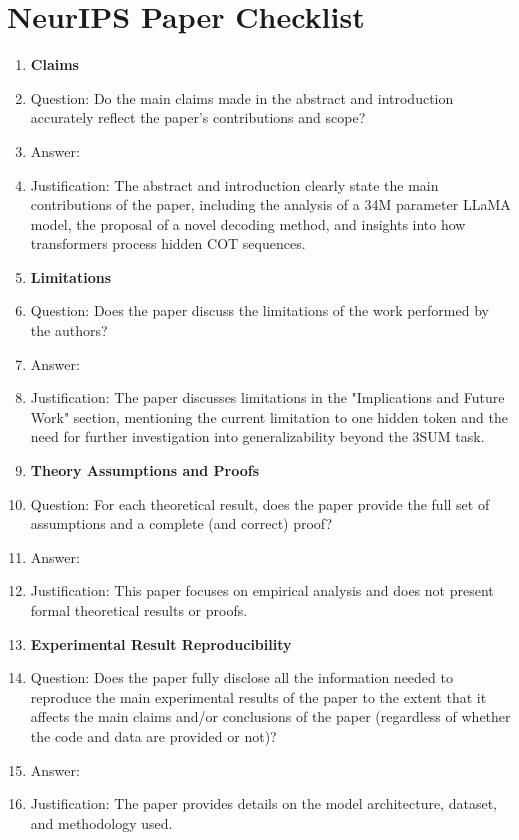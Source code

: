\documentclass{article}
\begin{document}



\section*{NeurIPS Paper Checklist}

\begin{enumerate}

\item {\bf Claims}
    \item[] Question: Do the main claims made in the abstract and introduction accurately reflect the paper's contributions and scope?
    \item[] Answer: \answerYes{} 
    \item[] Justification: The abstract and introduction clearly state the main contributions of the paper, including the analysis of a 34M parameter LLaMA model, the proposal of a novel decoding method, and insights into how transformers process hidden COT sequences.

\item {\bf Limitations}
    \item[] Question: Does the paper discuss the limitations of the work performed by the authors?
    \item[] Answer: \answerYes{} 
    \item[] Justification: The paper discusses limitations in the "Implications and Future Work" section, mentioning the current limitation to one hidden token and the need for further investigation into generalizability beyond the 3SUM task.

\item {\bf Theory Assumptions and Proofs}
    \item[] Question: For each theoretical result, does the paper provide the full set of assumptions and a complete (and correct) proof?
    \item[] Answer: \answerNA{} 
    \item[] Justification: This paper focuses on empirical analysis and does not present formal theoretical results or proofs.

\item {\bf Experimental Result Reproducibility}
    \item[] Question: Does the paper fully disclose all the information needed to reproduce the main experimental results of the paper to the extent that it affects the main claims and/or conclusions of the paper (regardless of whether the code and data are provided or not)?
    \item[] Answer: \answerYes{} 
    \item[] Justification: The paper provides details on the model architecture, dataset, and methodology used.


\end{enumerate}
\end{document}
